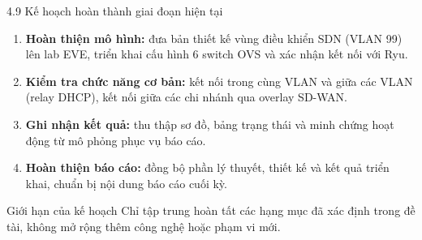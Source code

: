 \begin{frame}{4.9 Kế hoạch hoàn thành giai đoạn hiện tại}
    \begin{enumerate}
        \item \textbf{Hoàn thiện mô hình:} đưa bản thiết kế vùng điều khiển
              SDN (VLAN 99) lên lab EVE, triển khai cấu hình 6 switch OVS
              và xác nhận kết nối với Ryu.
        \vspace{0.15cm}
        \item \textbf{Kiểm tra chức năng cơ bản:} kết nối trong cùng VLAN
              và giữa các VLAN (relay DHCP), kết nối giữa các chi nhánh
              qua overlay SD-WAN.
        \vspace{0.15cm}
        \item \textbf{Ghi nhận kết quả:} thu thập sơ đồ, bảng trạng thái và
              minh chứng hoạt động từ mô phỏng phục vụ báo cáo.
        \vspace{0.15cm}
        \item \textbf{Hoàn thiện báo cáo:} đồng bộ phần lý thuyết, thiết kế
              và kết quả triển khai, chuẩn bị nội dung báo cáo cuối kỳ.
    \end{enumerate}
    \vspace{0.2cm}
    \begin{block}{Giới hạn của kế hoạch}
        Chỉ tập trung hoàn tất các hạng mục đã xác định trong đề tài, không mở rộng thêm công nghệ hoặc phạm vi mới.
    \end{block}
\end{frame}
